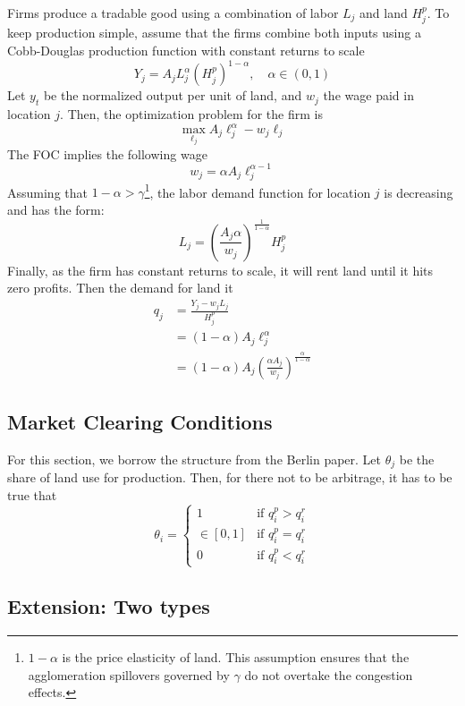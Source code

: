 \documentclass[12pt]{article}
\begin{document}
Firms produce a tradable good using a combination of labor $L_j$ and land $H_j^p$. To keep production simple, assume that the firms combine both inputs using a Cobb-Douglas production function with constant returns to scale
\begin{equation}
    Y_j = A_jL_j^\alpha \left(H_j^p\right)^{1-\alpha}, \quad\alpha\in(0,1)
\end{equation}
Let $y_t$ be the normalized output per unit of land, and $w_j$ the wage paid in location $j$. Then, the optimization problem for the firm is 
\begin{equation*}
    \max_{\ell_j} A_j\ell_j^\alpha - w_j\ell_j
\end{equation*}
The FOC implies the following wage
\begin{equation}
    w_j = \alpha A_j\ell_j^{\alpha-1}
\end{equation}
Assuming that $1-\alpha>\gamma$\footnote{$1-\alpha$ is the price elasticity of land. This assumption ensures that the agglomeration spillovers governed by $\gamma$ do not overtake the congestion effects.}, the labor demand function for location $j$ is decreasing and has the form: 
\begin{equation*}
    L_j = \left(\frac{A_j\alpha}{w_j}\right)^{\frac{1}{1-\alpha}}H_j^p
\end{equation*}
Finally, as the firm has constant returns to scale, it will rent land until it hits zero profits. Then the demand for land it 
\begin{align*}
    q_j &= \frac{Y_j - w_jL_j}{H^p_j} \\ 
    &= (1-\alpha)A_j\ell_j^{\alpha} \\ 
    &= (1-\alpha)A_j\left(\frac{\alpha A_j}{w_j}\right)^{\frac{\alpha}{1-\alpha}}
\end{align*}

\subsection{Market Clearing Conditions}
For this section, we borrow the structure from the Berlin paper. Let $\theta_j$ be the share of land use for production. Then, for there not to be arbitrage, it has to be true that 
\begin{equation*}
    \theta_i = \begin{cases}
    1 &\mbox{if } q_i^p>q_i^r \\ 
    \in[0,1] &\mbox{if } q_i^p=q_i^r \\
    0 &\mbox{if } q_i^p<q_i^r 
    \end{cases}
\end{equation*}

\subsection{Extension: Two types}
\end{document}
